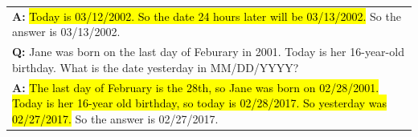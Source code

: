 \begin{table}[H]
\begin{tabular}{p{\linewidth}}
        \vspace{-1mm}
        \textbf{A:} \hl{Today is 03/12/2002. So the date 24 hours later will be 03/13/2002.} So the answer is 03/13/2002. \\
        \vspace{0mm}
        \textbf{Q:} Jane was born on the last day of Feburary in 2001. Today is her 16-year-old birthday. What is the date yesterday in MM/DD/YYYY? \\
        \vspace{-1mm}
        \textbf{A:} \hl{The last day of February is the 28th, so Jane was born on 02/28/2001. Today is her 16-year old birthday, so today is 02/28/2017. So yesterday was 02/27/2017.} So the answer is 02/27/2017. \\
        \bottomrule
    \end{tabular}
    \label{tab:appendix-date-understanding-prompt}
\end{table}
\endgroup
